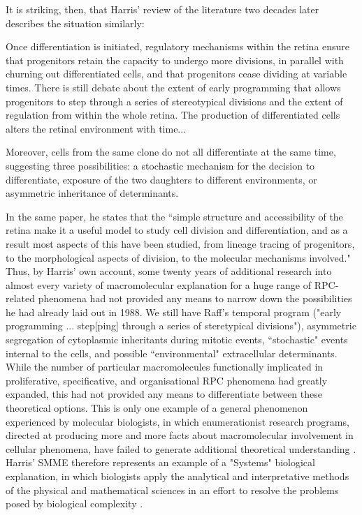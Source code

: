 It is striking, then, that Harris' review of the literature two decades later describes the situation similarly:

\begin{longquote}
Once differentiation is initiated, regulatory
mechanisms within the retina ensure that progenitors retain the capacity to undergo more
divisions, in parallel with churning out differentiated cells, and that progenitors cease dividing at variable times. There is still debate
about the extent of early programming that allows progenitors to step through a series of
stereotypical divisions and the extent of regulation from within the whole retina. The production of differentiated cells alters the retinal
environment with time...

Moreover, cells from the same clone do not all
differentiate at the same time, suggesting three
possibilities: a stochastic mechanism for the
decision to differentiate, exposure of the two
daughters to different environments, or asymmetric inheritance of determinants.
\cite{Agathocleous2009}
\end{longquote}

In the same paper, he states that the ``simple structure and accessibility of the retina make it a useful model to study cell division and differentiation, and as a result most aspects of this have been studied, from lineage tracing of progenitors, to the morphological aspects of division, to the molecular mechanisms involved." Thus, by Harris' own account, some twenty years of additional research into almost every variety of macromolecular explanation for a huge range of RPC-related phenomena had not provided any means to narrow down the possibilities he had already laid out in 1988. We still have Raff's temporal program ("early programming ... step[ping] through a series of steretypical divisions"), asymmetric segregation of cytoplasmic inheritants during mitotic events, ``stochastic" events internal to the cells, and possible ``environmental" extracellular determinants. While the number of particular macromolecules functionally implicated in proliferative, specificative, and organisational RPC phenomena had greatly expanded, this had not provided any means to differentiate between these theoretical options. This is only one example of a general phenomenon experienced by molecular biologists, in which enumerationist research programs, directed at producing more and more facts about macromolecular involvement in cellular phenomena, have failed to generate additional theoretical understanding \cite{Kaneko2006}. Harris' SMME therefore represents an example of a "Systems" biological explanation, in which biologists apply the analytical and interpretative methods of the physical and mathematical sciences in an effort to resolve the problems posed by biological complexity \cite{Morange2009}.

